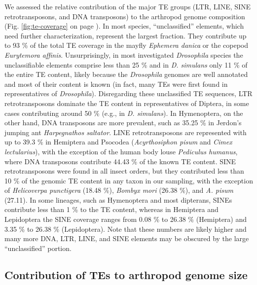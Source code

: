 We assessed the relative contribution of the major TE groups (LTR, LINE,
SINE retrotransposons, and DNA transposons) to the arthropod genome
composition (Fig. \ref{fig:te-coverage} on page
\pageref{fig:te-coverage}). In most species, ``unclassified'' elements,
which need further characterization, represent the largest fraction.
They contribute up to 93 \% of the total TE coverage in the mayfly
\emph{Ephemera danica} or the copepod \emph{Eurytemora affinis}.
Unsurprisingly, in most investigated \emph{Drosophila} species the
unclassifiable elements comprise less than 25 \% and in \emph{D.
simulans} only 11 \% of the entire TE content, likely because the
\emph{Drosophila} genomes are well annotated and most of their content
is known (in fact, many TEs were first found in representatives of
\emph{Drosophila}). Disregarding these unclassified TE sequences, LTR
retrotransposons dominate the TE content in representatives of Diptera,
in some cases contributing around 50 \% (e.g., in \emph{D. simulans}).
In Hymenoptera, on the other hand, DNA transposons are more prevalent,
such as 35.25 \% in Jerdon's jumping ant \emph{Harpegnathos saltator}.
LINE retrotransposons are represented with up to 39.3 \% in Hemiptera
and Psocodea (\emph{Acyrthosiphon pisum} and \emph{Cimex lectularius}),
with the exception of the human body louse \emph{Pediculus humanus},
where DNA transposons contribute 44.43 \% of the known TE content. SINE
retrotransposons were found in all insect orders, but they contributed
less than 10 \% of the genomic TE content in any taxon in our sampling,
with the exception of \emph{Helicoverpa punctigera} (18.48 \%),
\emph{Bombyx mori} (26.38 \%), and \emph{A. pisum} (27.11). In some
lineages, such as Hymenoptera and most dipterans, SINEs contribute less
than 1 \% to the TE content, whereas in Hemiptera and Lepidoptera the
SINE coverage ranges from 0.08 \% to 26.38 \% (Hemiptera) and 3.35 \% to
26.38 \% (Lepidoptera). Note that these numbers are likely higher and
many more DNA, LTR, LINE, and SINE elements may be obscured by the large
``unclassified'' portion.

\subsection{Contribution of TEs to arthropod genome
size}\label{contribution-of-tes-to-arthropod-genome-size}

